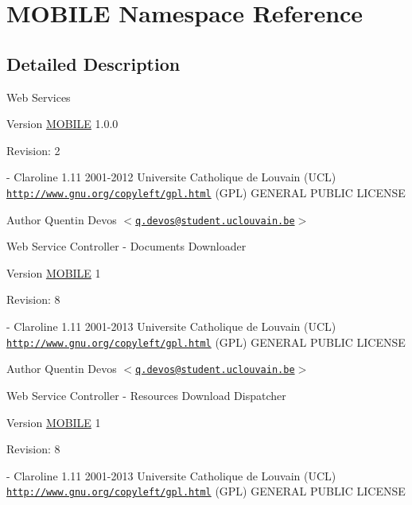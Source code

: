 \hypertarget{namespace_m_o_b_i_l_e}{
\section{MOBILE Namespace Reference}
\label{namespace_m_o_b_i_l_e}
}


\subsection{Detailed Description}
Web Services

\begin{DoxyVersion}{Version}
\hyperlink{namespace_m_o_b_i_l_e}{MOBILE} 1.0.0 
\end{DoxyVersion}
\begin{DoxyParagraph}{Revision:}
2 
\end{DoxyParagraph}
-\/ Claroline 1.11  2001-\/2012 Universite Catholique de Louvain (UCL)  \href{http://www.gnu.org/copyleft/gpl.html}{\tt http://www.gnu.org/copyleft/gpl.html} (GPL) GENERAL PUBLIC LICENSE

\begin{DoxyAuthor}{Author}
Quentin Devos $<$\href{mailto:q.devos@student.uclouvain.be}{\tt q.devos@student.uclouvain.be}$>$
\end{DoxyAuthor}
Web Service Controller -\/ Documents Downloader

\begin{DoxyVersion}{Version}
\hyperlink{namespace_m_o_b_i_l_e}{MOBILE} 1 
\end{DoxyVersion}
\begin{DoxyParagraph}{Revision:}
8 
\end{DoxyParagraph}
-\/ Claroline 1.11  2001-\/2013 Universite Catholique de Louvain (UCL)  \href{http://www.gnu.org/copyleft/gpl.html}{\tt http://www.gnu.org/copyleft/gpl.html} (GPL) GENERAL PUBLIC LICENSE

\begin{DoxyAuthor}{Author}
Quentin Devos $<$\href{mailto:q.devos@student.uclouvain.be}{\tt q.devos@student.uclouvain.be}$>$
\end{DoxyAuthor}
Web Service Controller -\/ Resources Download Dispatcher

\begin{DoxyVersion}{Version}
\hyperlink{namespace_m_o_b_i_l_e}{MOBILE} 1 
\end{DoxyVersion}
\begin{DoxyParagraph}{Revision:}
8 
\end{DoxyParagraph}
-\/ Claroline 1.11  2001-\/2013 Universite Catholique de Louvain (UCL)  \href{http://www.gnu.org/copyleft/gpl.html}{\tt http://www.gnu.org/copyleft/gpl.html} (GPL) GENERAL PUBLIC LICENSE

